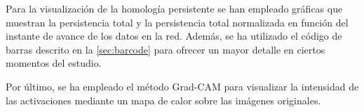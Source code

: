 
Para la visualización de la homología persistente se han empleado gráficas que
muestran la persistencia total y la persistencia total normalizada en función
del instante de avance de los datos en la red. Además, se ha utilizado el código
de barras descrito en la \autoref{sec:barcode} para ofrecer un mayor detalle en
ciertos momentos del estudio.

Por último, se ha empleado el método Grad-CAM \cite{Selvaraju_2019} para visualizar
la intensidad de las activaciones mediante un mapa de calor sobre las imágenes originales.

\endinput
